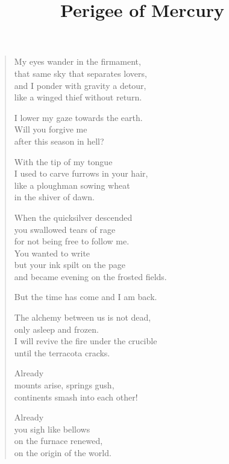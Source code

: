 \documentclass[twocolumn,11pt]{article}
\title{Perigee of Mercury}
\author{}
\date{}
\begin{document}
\maketitle

\thispagestyle{empty}



\bigskip

\begin{verse}%
  My eyes wander in the firmament, \\
  that same sky that separates lovers, \\
  and I ponder with gravity a detour, \\
  like a winged thief without return.

  I lower my gaze towards the earth. \\
  Will you forgive me \\
  after this season in hell?

  With the tip of my tongue \\
  I used to carve furrows in your hair, \\
  like a ploughman sowing wheat \\
  in the shiver of dawn.

  When the quicksilver descended \\
  you swallowed tears of rage \\
  for not being free to follow me. \\
  You wanted to write \\
  but your ink spilt on the page \\
  and became evening on the frosted fields.

  But the time has come and I am back.

  The alchemy between us is not dead, \\
  only asleep and frozen. \\
  I will revive the fire under the crucible \\
  until the terracota cracks.

  \newpage

  Already \\
  mounts arise, springs gush, \\
  continents smash into each other!

  Already \\
  you sigh like bellows \\
  on the furnace renewed, \\
  on the origin of the world.


\end{verse}
\end{document}
